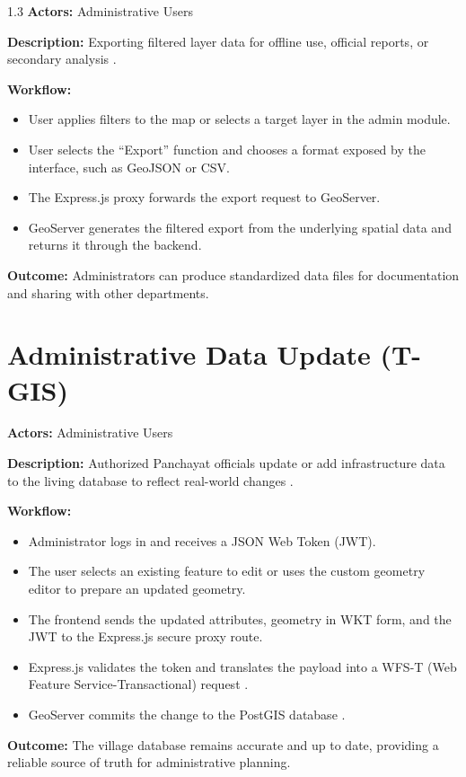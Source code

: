\begin{spacing}{1.3}
\textbf{Actors:} Administrative Users

\textbf{Description:}
Exporting filtered layer data for offline use, official reports, or secondary analysis \cite{fu2020webgis}.

\textbf{Workflow:}
\begin{itemize}
    \item User applies filters to the map or selects a target layer in the admin module.
    \item User selects the ``Export'' function and chooses a format exposed by the interface, such as GeoJSON or CSV.
    \item The Express.js proxy forwards the export request to GeoServer.
    \item GeoServer generates the filtered export from the underlying spatial data and returns it through the backend.
\end{itemize}

\textbf{Outcome:}
Administrators can produce standardized data files for documentation and sharing with other departments.

\section{Administrative Data Update (T-GIS)}

\textbf{Actors:} Administrative Users

\textbf{Description:}
Authorized Panchayat officials update or add infrastructure data to the living database to reflect real-world changes \cite{smart_panchayat2023}.

\textbf{Workflow:}
\begin{itemize}
    \item Administrator logs in and receives a JSON Web Token (JWT).
    \item The user selects an existing feature to edit or uses the custom geometry editor to prepare an updated geometry.
    \item The frontend sends the updated attributes, geometry in WKT form, and the JWT to the Express.js secure proxy route.
    \item Express.js validates the token and translates the payload into a WFS-T (Web Feature Service-Transactional) request \cite{fu2020webgis}.
    \item GeoServer commits the change to the PostGIS database \cite{postgis_in_action}.
\end{itemize}

\textbf{Outcome:}
The village database remains accurate and up to date, providing a reliable source of truth for administrative planning.


\end{spacing}
